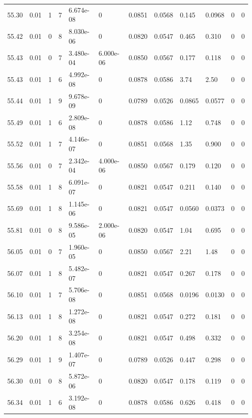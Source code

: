 \documentclass[preview]{standalone}
\begin{document}
{{{{{{{{{{{{{{{\begin{tabular}{L{1.2cm}C{1.2cm} C{0.3cm}C{0.5cm} C{1.4cm}C{1.4cm} C{1.4cm}C{1.4cm} C{1.6cm}C{1.6cm} C{1.6cm}C{1.6cm}}
  55.30  &  0.01  & 1     &  7 &  6.674e-08  & 0  &  0.0851&   0.0568& 0.145 & 0.0968   &  0 & 0  \\ 
  55.42  &  0.01  & 0     &  8 &  8.030e-06  & 0  &  0.0820&   0.0547& 0.465 & 0.310   &  0 & 0  \\ 
  55.43  &  0.01  & 0     &  7 &  3.480e-04  & 6.000e-06  &  0.0850&   0.0567& 0.177 & 0.118   &  0 & 0  \\ 
  55.43  &  0.01  & 1     &  6 &  4.992e-08  & 0  &  0.0878&   0.0586& 3.74 & 2.50   &  0 & 0  \\ 
  55.44  &  0.01  & 1     &  9 &  9.678e-09  & 0  &  0.0789&   0.0526& 0.0865 & 0.0577   &  0 & 0  \\ 
  55.49  &  0.01  & 1     &  6 &  2.809e-08  & 0  &  0.0878&   0.0586& 1.12 & 0.748   &  0 & 0  \\ 
  55.52  &  0.01  & 1     &  7 &  4.146e-07  & 0  &  0.0851&   0.0568& 1.35 & 0.900   &  0 & 0  \\ 
  55.56  &  0.01  & 0     &  7 &  2.342e-04  & 4.000e-06  &  0.0850&   0.0567& 0.179 & 0.120   &  0 & 0  \\ 
  55.58  &  0.01  & 1     &  8 &  6.091e-07  & 0  &  0.0821&   0.0547& 0.211 & 0.140   &  0 & 0  \\ 
  55.69  &  0.01  & 1     &  8 &  1.145e-06  & 0  &  0.0821&   0.0547& 0.0560 & 0.0373   &  0 & 0  \\ 
  55.81  &  0.01  & 0     &  8 &  9.586e-05  & 2.000e-06  &  0.0820&   0.0547& 1.04 & 0.695   &  0 & 0  \\ 
  56.05  &  0.01  & 0     &  7 &  1.960e-05  & 0  &  0.0850&   0.0567& 2.21 & 1.48   &  0 & 0  \\ 
  56.07  &  0.01  & 1     &  8 &  5.482e-07  & 0  &  0.0821&   0.0547& 0.267 & 0.178   &  0 & 0  \\ 
  56.10  &  0.01  & 1     &  7 &  5.706e-08  & 0  &  0.0851&   0.0568& 0.0196 & 0.0130   &  0 & 0  \\ 
  56.13  &  0.01  & 1     &  8 &  1.272e-08  & 0  &  0.0821&   0.0547& 0.272 & 0.181   &  0 & 0  \\ 
  56.20  &  0.01  & 1     &  8 &  3.254e-08  & 0  &  0.0821&   0.0547& 0.498 & 0.332   &  0 & 0  \\ 
  56.29  &  0.01  & 1     &  9 &  1.407e-07  & 0  &  0.0789&   0.0526& 0.447 & 0.298   &  0 & 0  \\ 
  56.30  &  0.01  & 0     &  8 &  5.872e-06  & 0  &  0.0820&   0.0547& 0.178 & 0.119   &  0 & 0  \\ 
  56.34  &  0.01  & 1     &  6 &  3.192e-08  & 0  &  0.0878&   0.0586& 0.626 & 0.418   &  0 & 0  \\ 

\end{tabular}}}}}}}}}}}}}}}}
\end{document}

